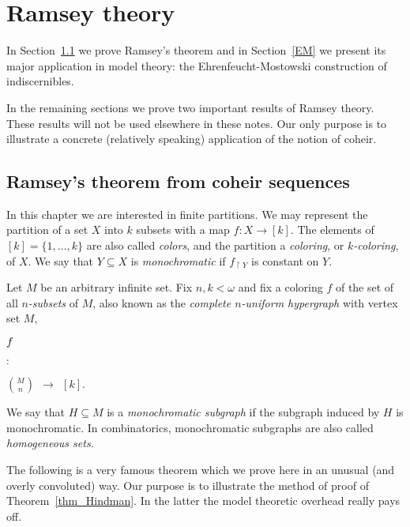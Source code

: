 \chapter{Ramsey theory}
\label{ramsey}

In Section~\ref{Ramsey} we prove Ramsey's theorem and in Section~\ref{EM} we present its major application in model theory: 
the Ehrenfeucht-Mostowski construction of indiscernibles.

In the remaining sections we prove two important results of Ramsey theory.
These results will not be used elsewhere in these notes.
Our only purpose is to illustrate a concrete (relatively speaking) application of the notion of coheir.

\def\medrel#1{\parbox[t]{6ex}{$\displaystyle\hfil #1$}}
\def\ceq#1#2#3{\parbox[t]{12ex}{$\displaystyle #1$}\medrel{#2}{$\displaystyle #3$}}

\section{Ramsey's theorem from coheir sequences}
\label{Ramsey}

In this chapter we are interested in finite partitions.
We may represent the partition of a set $X$ into $k$ subsets with a map $f:X\to [k]$.
The elements of $[k]=\{1,\dots,k\}$ are also called \emph{colors},
and the partition a \emph{coloring},
or \emph{$k$-coloring}, of $X$.
We say that $Y\subseteq X$ is \emph{monochromatic\/} if $f_{\restriction Y}$ is constant on $Y$.

Let $M$ be an arbitrary infinite set.
Fix $n,k<\omega$ and fix a coloring $f$ of the set of all \emph{$n$-subsets} of $M$,
also known as the \emph{complete $n$-uniform hypergraph\/} with vertex set $M$,

\ceq{\hfill f}{:}{ \binom{M}{n}\ \ \to\ \ [k]}.

We say that $H\subseteq M$ is a \emph{monochromatic subgraph\/} if the subgraph induced by $H$ is monochromatic.
In combinatorics, monochromatic subgraphs are also called \emph{homogeneous sets.}

The following is a very famous theorem which we prove here in an unusual (and overly convoluted)  way.
Our purpose is to illustrate the method of proof of Theorem~\ref{thm_Hindman}.
In the latter the model theoretic overhead really pays off.

